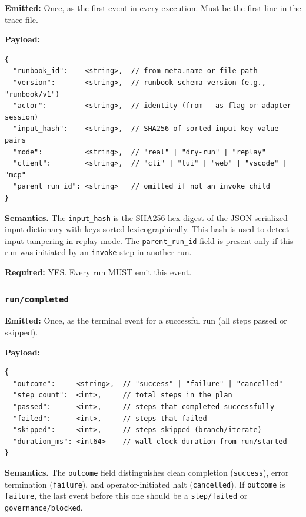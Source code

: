 \textbf{Emitted:} Once, as the first event in every execution. Must be the first line in the trace file.

\textbf{Payload:}
\begin{verbatim}
{
  "runbook_id":    <string>,  // from meta.name or file path
  "version":       <string>,  // runbook schema version (e.g., "runbook/v1")
  "actor":         <string>,  // identity (from --as flag or adapter session)
  "input_hash":    <string>,  // SHA256 of sorted input key-value pairs
  "mode":          <string>,  // "real" | "dry-run" | "replay"
  "client":        <string>,  // "cli" | "tui" | "web" | "vscode" | "mcp"
  "parent_run_id": <string>   // omitted if not an invoke child
}
\end{verbatim}

\textbf{Semantics.} The \texttt{input\_hash} is the SHA256 hex digest of the JSON-serialized input dictionary with keys sorted lexicographically. This hash is used to detect input tampering in replay mode. The \texttt{parent\_run\_id} field is present only if this run was initiated by an \texttt{invoke} step in another run.

\textbf{Required:} YES. Every run MUST emit this event.


\subsubsection{\texttt{run/completed}}

\textbf{Emitted:} Once, as the terminal event for a successful run (all steps passed or skipped).

\textbf{Payload:}
\begin{verbatim}
{
  "outcome":     <string>,  // "success" | "failure" | "cancelled"
  "step_count":  <int>,     // total steps in the plan
  "passed":      <int>,     // steps that completed successfully
  "failed":      <int>,     // steps that failed
  "skipped":     <int>,     // steps skipped (branch/iterate)
  "duration_ms": <int64>    // wall-clock duration from run/started
}
\end{verbatim}

\textbf{Semantics.} The \texttt{outcome} field distinguishes clean completion (\texttt{success}), error termination (\texttt{failure}), and operator-initiated halt (\texttt{cancelled}). If \texttt{outcome} is \texttt{failure}, the last event before this one should be a \texttt{step/failed} or \texttt{governance/blocked}.

